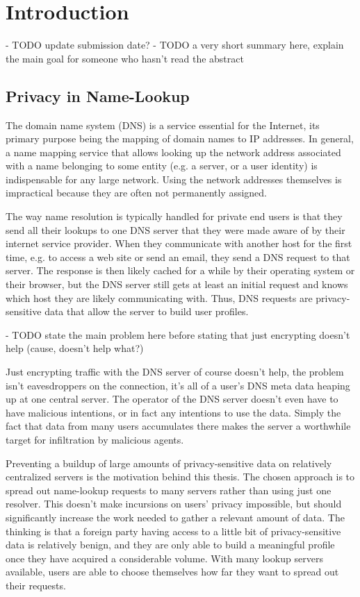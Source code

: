 \chapter{Introduction}
- TODO update submission date?
- TODO a very short summary here, explain the main goal for someone who hasn't
  read the abstract

\section{Privacy in Name-Lookup}
The domain name system (DNS) is a service essential for the Internet, its
primary purpose being the mapping of domain names to IP addresses. In general, a
name mapping service that allows looking up the network address associated with
a name belonging to some entity (e.g. a server, or a user identity) is
indispensable for any large network. Using the network addresses themselves is
impractical because they are often not permanently assigned.

The way name resolution is typically handled for private end users is that they
send all their lookups to one DNS server that they were made aware of by their
internet service provider. When they communicate with another host for the first
time, e.g. to access a web site or send an email, they send a DNS request to
that server. The response is then likely cached for a while by their
operating system or their browser, but the DNS server still gets at least an
initial request and knows which host they are likely communicating with. Thus,
DNS requests are privacy-sensitive data that allow the server to build user
profiles.

- TODO state the main problem here before stating that just encrypting doesn't
  help (cause, doesn't help what?)

Just encrypting traffic with the DNS server of course doesn't help, the problem
isn't eavesdroppers on the connection, it's all of a user's DNS meta data
heaping up at one central server. The operator of the DNS server doesn't even
have to have malicious intentions, or in fact any intentions to use the data.
Simply the fact that data from many users accumulates there makes the server a
worthwhile target for infiltration by malicious agents.

Preventing a buildup of large amounts of privacy-sensitive data on relatively
centralized servers is the motivation behind this thesis. The chosen approach is
to spread out name-lookup requests to many servers rather than using just one
resolver. This doesn't make incursions on users' privacy impossible, but should
significantly increase the work needed to gather a relevant amount of data. The
thinking is that a foreign party having access to a little bit of
privacy-sensitive data is relatively benign, and they are only able to build a
meaningful profile once they have acquired a considerable volume. With many
lookup servers available, users are able to choose themselves how far they want
to spread out their requests.

